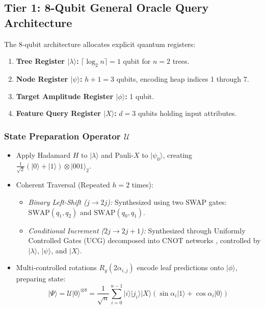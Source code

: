 \documentclass[sn-mathphys,Numbered]{sn-jnl}
\theoremstyle{thmstyleone}
\theoremstyle{thmstyletwo}
\theoremstyle{thmstylethree}
\begin{document}
\subsection{Tier 1: 8-Qubit General Oracle Query Architecture}\label{subsec4.1}

The 8-qubit architecture allocates explicit quantum registers:
\begin{enumerate}
    \item \textbf{Tree Register $|\lambda\rangle$:} $\lceil \log_2 n \rceil = 1$ qubit for $n = 2$ trees.
    \item \textbf{Node Register $|\psi\rangle$:} $h + 1 = 3$ qubits, encoding heap indices 1 through 7.
    \item \textbf{Target Amplitude Register $|\phi\rangle$:} 1 qubit.
    \item \textbf{Feature Query Register $|X\rangle$:} $d = 3$ qubits holding input attributes.
\end{enumerate}

\subsubsection{State Preparation Operator $\mathcal{U}$}
\begin{itemize}
    \item Apply Hadamard $H$ to $|\lambda\rangle$ and Pauli-$X$ to $|\psi_0\rangle$, creating $\frac{1}{\sqrt{2}}(|0\rangle + |1\rangle) \otimes |001\rangle_2$.
    \item Coherent Traversal (Repeated $h = 2$ times):
    \begin{itemize}
        \item \emph{Binary Left-Shift ($j \to 2j$):} Synthesized using two SWAP gates: $\text{SWAP}(q_1, q_2)$ and $\text{SWAP}(q_0, q_1)$.
        \item \emph{Conditional Increment ($2j \to 2j + 1$):} Synthesized through Uniformly Controlled Gates (UCG) decomposed into CNOT networks \cite{shende2006synthesis}, controlled by $|\lambda\rangle$, $|\psi\rangle$, and $|X\rangle$.
    \end{itemize}
    \item Multi-controlled rotations $R_y(2\alpha_{i,j})$ encode leaf predictions onto $|\phi\rangle$, preparing state:
    \begin{equation}\label{eq9}
    |\Psi\rangle = \mathcal{U}|0\rangle^{\otimes 8} = \frac{1}{\sqrt{n}} \sum_{i=0}^{n-1} |i\rangle |j_i\rangle |X\rangle (\sin \alpha_i |1\rangle + \cos \alpha_i |0\rangle)
    \end{equation}
\end{itemize}
\end{document}
